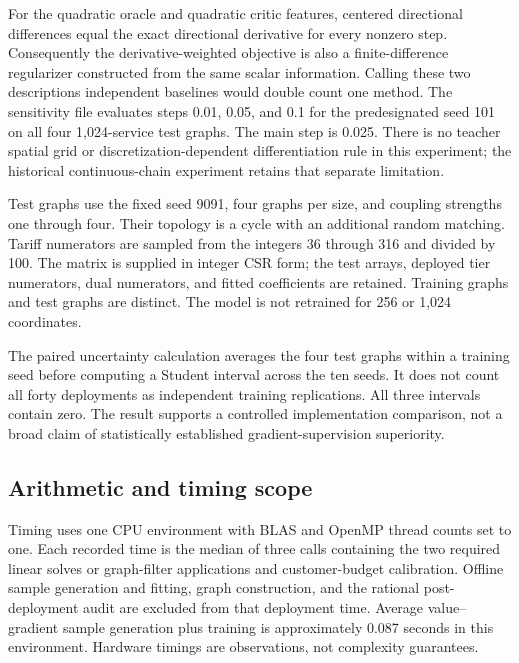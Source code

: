 For the quadratic oracle and quadratic critic features, centered directional differences equal the exact directional derivative for every nonzero step. Consequently the derivative-weighted objective is also a finite-difference regularizer constructed from the same scalar information. Calling these two descriptions independent baselines would double count one method. The sensitivity file evaluates steps 0.01, 0.05, and 0.1 for the predesignated seed 101 on all four 1,024-service test graphs. The main step is 0.025. There is no teacher spatial grid or discretization-dependent differentiation rule in this experiment; the historical continuous-chain experiment retains that separate limitation.

Test graphs use the fixed seed 9091, four graphs per size, and coupling strengths one through four. Their topology is a cycle with an additional random matching. Tariff numerators are sampled from the integers 36 through 316 and divided by 100. The matrix is supplied in integer CSR form; the test arrays, deployed tier numerators, dual numerators, and fitted coefficients are retained. Training graphs and test graphs are distinct. The model is not retrained for 256 or 1,024 coordinates.


The paired uncertainty calculation averages the four test graphs within a training seed before computing a Student interval across the ten seeds. It does not count all forty deployments as independent training replications. All three intervals contain zero. The result supports a controlled implementation comparison, not a broad claim of statistically established gradient-supervision superiority.


\subsection{Arithmetic and timing scope}
Timing uses one CPU environment with BLAS and OpenMP thread counts set to one. Each recorded time is the median of three calls containing the two required linear solves or graph-filter applications and customer-budget calibration. Offline sample generation and fitting, graph construction, and the rational post-deployment audit are excluded from that deployment time. Average value--gradient sample generation plus training is approximately 0.087 seconds in this environment. Hardware timings are observations, not complexity guarantees.

